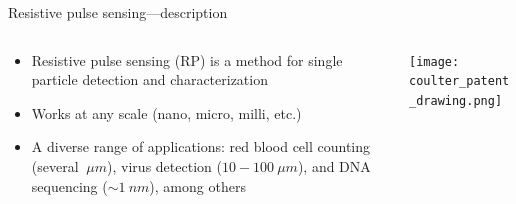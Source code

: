 \begin{frame}[c]{Resistive pulse sensing---description}
	
	\begin{columns}[t]
		\begin{column}[T]{2.75in}
	
			\begin{itemize}
				\item Resistive pulse sensing (RP) is a method for single particle detection and characterization
				\item Works at any scale (nano, micro, milli, etc.)
				\item A diverse range of applications: red blood cell counting (several $\SI{}{\mu m}$), virus detection ($10-\SI{100}{\mu m}$), and DNA sequencing ($\sim\SI{1}{nm}$), among others
			\end{itemize}
	
		\end{column}
		
		\begin{column}[T]{1.75in}
			\texttt{[image: coulter\_patent\_drawing.png]}
		\end{column}
		
	\end{columns}

	
\end{frame}





